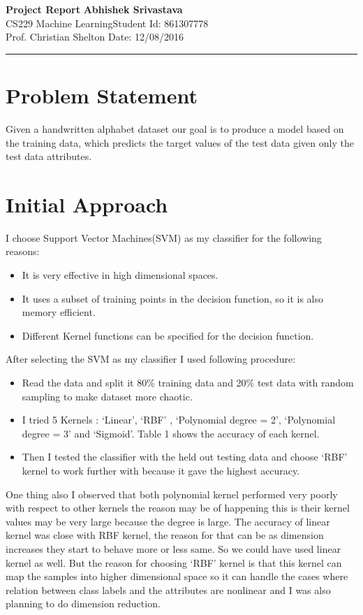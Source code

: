 \documentclass[a4paper, 11pt]{article}
\begin{document}
\noindent
\large\textbf{Project Report} \hfill \textbf{Abhishek Srivastava} \\
\normalsize CS229 Machine Learning\hfill Student Id: 861307778 \\
Prof. Christian Shelton \hfill Date: 12/08/2016 \\

\hrule

\section*{Problem Statement}
Given a handwritten alphabet dataset our goal is to produce a model based on the training data, which predicts the target values of the test data given only the test data attributes.

\section*{Initial Approach}
I choose Support Vector Machines(SVM) as my classifier for the following reasons:
\begin{itemize}
	\item It is very effective in high dimensional spaces.
	\item It uses a subset of training points in the decision  function, so it is also memory efficient.
	\item Different Kernel functions can be specified for the decision function.
\end{itemize}
After selecting the SVM as my classifier I used following procedure:
\begin{itemize}
	\item Read the data and split it 80\% training data and 20\% test data with random sampling to make dataset more chaotic.
	\item I tried 5 Kernels : `Linear', `RBF' , `Polynomial degree = 2', `Polynomial degree = 3' and `Sigmoid'. Table 1 shows the accuracy of each kernel.
	\item Then I tested the classifier with the held out testing data and choose `RBF' kernel to work further with because it gave the highest accuracy.
\end{itemize}

One thing also I observed that both polynomial kernel performed very poorly with respect to other kernels the reason may be of happening this is their kernel values may be very large because the degree is large. The accuracy of linear kernel was close with RBF kernel, the reason for that can be as dimension increases they start to behave more or less same. So we could have used linear kernel as well. But the reason for choosing `RBF' kernel is that this kernel can map the samples into higher dimensional space so it can handle the cases where relation between class labels and the attributes are nonlinear and I was also planning to do dimension reduction.\cite{svmguide}
\end{document}
